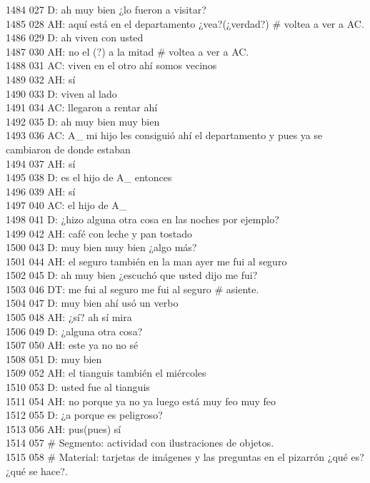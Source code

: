 1484 027 D: ah muy bien ¿lo fueron a visitar?\\
1485 028 AH: aquí está en el departamento ¿vea?(¿verdad?) # voltea a ver a AC.\\
1486 029 D: ah viven con usted\\
1487 030 AH: no el (?) a la mitad # voltea a ver a AC.\\
1488 031 AC: viven en el otro ahí somos vecinos\\
1489 032 AH: sí\\
1490 033 D: viven al lado\\
1491 034 AC: llegaron a rentar ahí\\
1492 035 D: ah muy bien muy bien\\
1493 036 AC: A_ mi hijo les consiguió ahí el departamento y pues ya se cambiaron de donde estaban\\
1494 037 AH: sí\\
1495 038 D: es el hijo de A_ entonces\\
1496 039 AH: sí\\
1497 040 AC: el hijo de A_\\
1498 041 D: ¿hizo alguna otra cosa en las noches por ejemplo?\\
1499 042 AH: café con leche y pan tostado\\
1500 043 D: muy bien muy bien ¿algo más?\\
1501 044 AH: el seguro también en la man ayer me fui al seguro\\
1502 045 D: ah muy bien ¿escuchó que usted dijo me fui?\\
1503 046 DT: me fui al seguro me fui al seguro # asiente.\\
1504 047 D: muy bien ahí usó un verbo\\
1505 048 AH: ¿sí? ah sí mira\\
1506 049 D: ¿alguna otra cosa?\\
1507 050 AH: este ya no no sé\\
1508 051 D: muy bien\\
1509 052 AH: el tianguis también el miércoles\\
1510 053 D: usted fue al tianguis\\
1511 054 AH: no porque ya no ya luego está muy feo muy feo\\
1512 055 D: ¿a porque es peligroso?\\
1513 056 AH: pus(pues) sí\\
1514 057 # Segmento: actividad con ilustraciones de objetos.\\
1515 058 # Material: tarjetas de imágenes y las preguntas en el pizarrón ¿qué es? ¿qué se hace?.\\
